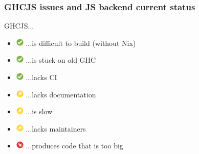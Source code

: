 \documentclass[aspectratio=169]{beamer}
\begin{document}
\begin{frame}
\frametitle{GHCJS issues and JS backend current status}
GHCJS...
\begin{itemize}
\item[]
\includegraphics[height=1em]{images/check_green.png}
...is difficult to build (without Nix)

\item[]
\includegraphics[height=1em]{images/check_green.png}
...is stuck on old GHC

\item[]
\includegraphics[height=1em]{images/check_green.png}
...lacks CI

\item[]
\includegraphics[height=1em]{images/arrow-up-right-yellow.png}
...lacks documentation

\item[]
\includegraphics[height=1em]{images/arrow-up-right-yellow.png}
...is slow

\item[]
\includegraphics[height=1em]{images/arrow-up-right-yellow.png}
...lacks maintainers

\item[]
\includegraphics[height=1em]{images/arrow-down-right-red.svg.png}
...produces code that is too big

\end{itemize}
\end{frame}
\end{document}
